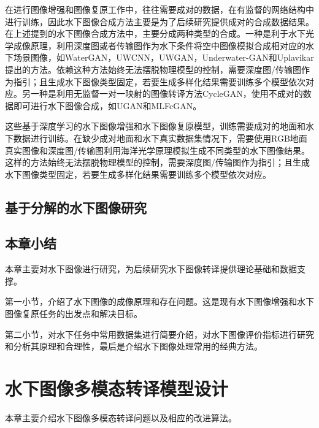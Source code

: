 
在进行图像增强和图像复原工作中，往往需要成对的数据，在有监督的网络结构中进行训练，因此水下图像合成方法主要是为了后续研究提供成对的合成数据结果。在上述提到的水下图像合成方法中，主要分成两种类型的合成。一种是利于水下光学成像原理，利用深度图或者传输图作为水下条件将空中图像模拟合成相对应的水下场景图像，如WaterGAN，UWCNN，UWGAN，Underwater-GAN和Uplavikar提出的方法。依赖这种方法始终无法摆脱物理模型的控制，需要深度图/传输图作为指引；且生成水下图像类型固定，若要生成多样化结果需要训练多个模型依次对应。另一种是利用无监督一对一映射的图像转译方法CycleGAN，使用不成对的数据即可进行水下图像合成，如UGAN和MLFcGAN。

这些基于深度学习的水下图像增强和水下图像复原模型，训练需要成对的地面和水下数据进行训练。在缺少成对地面和水下真实数据集情况下，需要使用RGB地面真实图像和深度图/传输图利用海洋光学原理模拟生成不同类型的水下图像结果。这样的方法始终无法摆脱物理模型的控制，需要深度图/传输图作为指引；且生成水下图像类型固定，若要生成多样化结果需要训练多个模型依次对应。

\section{基于分解的水下图像研究}


\section{本章小结}
本章主要对水下图像进行研究，为后续研究水下图像转译提供理论基础和数据支撑。

第一小节，介绍了水下图像的成像原理和存在问题。这是现有水下图像增强和水下图像复原任务的出发点和解决目标。

第二小节，对水下任务中常用数据集进行简要介绍，对水下图像评价指标进行研究和分析其原理和合理性，最后是介绍水下图像处理常用的经典方法。


\chapter{水下图像多模态转译模型设计}
本章主要介绍水下图像多模态转译问题以及相应的改进算法。


